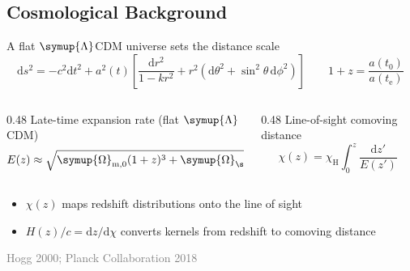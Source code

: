 \documentclass[aspectratio=1610, 10pt]{beamer}
\newcommand{\source}[1]{{\par\hfill\tiny\textcolor{gray}{#1}\par}}
\begin{document}
\subsection{Cosmological Background}
\begin{frame}{A flat $\symup{\Lambda}$CDM universe sets the distance scale}
  \begin{equation*}
    \mathrm{d}s^2 = -c^2 \mathrm{d}t^2 + a^2(t) \left[ \frac{\mathrm{d}r^2}{1 - k r^2}
    + r^2 \left(\mathrm{d}\theta^2 + \sin^2\theta\, \mathrm{d}\phi^2\right) \right]
    \qquad
    1+z = \frac{a(t_0)}{a(t_{\mathrm{e}})}
  \end{equation*}
  \begin{columns}[c]
    \begin{column}{0.48\textwidth}
      Late-time expansion rate (flat $\symup{\Lambda}$CDM)
      \begin{equation*}
        E(z) \approx \sqrt{\symup{\Omega}_{\mathrm{m},0}(1+z)^3 + \symup{\Omega}_{\symup{\Lambda},0}}
      \end{equation*}
    \end{column}
    \begin{column}{0.48\textwidth}
      Line-of-sight comoving distance
      \begin{equation*}
        \chi(z) = \chi_{\mathrm{H}} \int_0^z \frac{\mathrm{d}z'}{E(z')}
      \end{equation*}
    \end{column}
  \end{columns}
  \bigskip
  \begin{itemize}
    \item $\chi(z)$ maps redshift distributions onto the line of sight
    \item $H(z)/c = \mathrm{d}z/\mathrm{d}\chi$ converts kernels from redshift to comoving distance
  \end{itemize}
  \source{Hogg 2000; Planck Collaboration 2018}
\end{frame}
\end{document}
